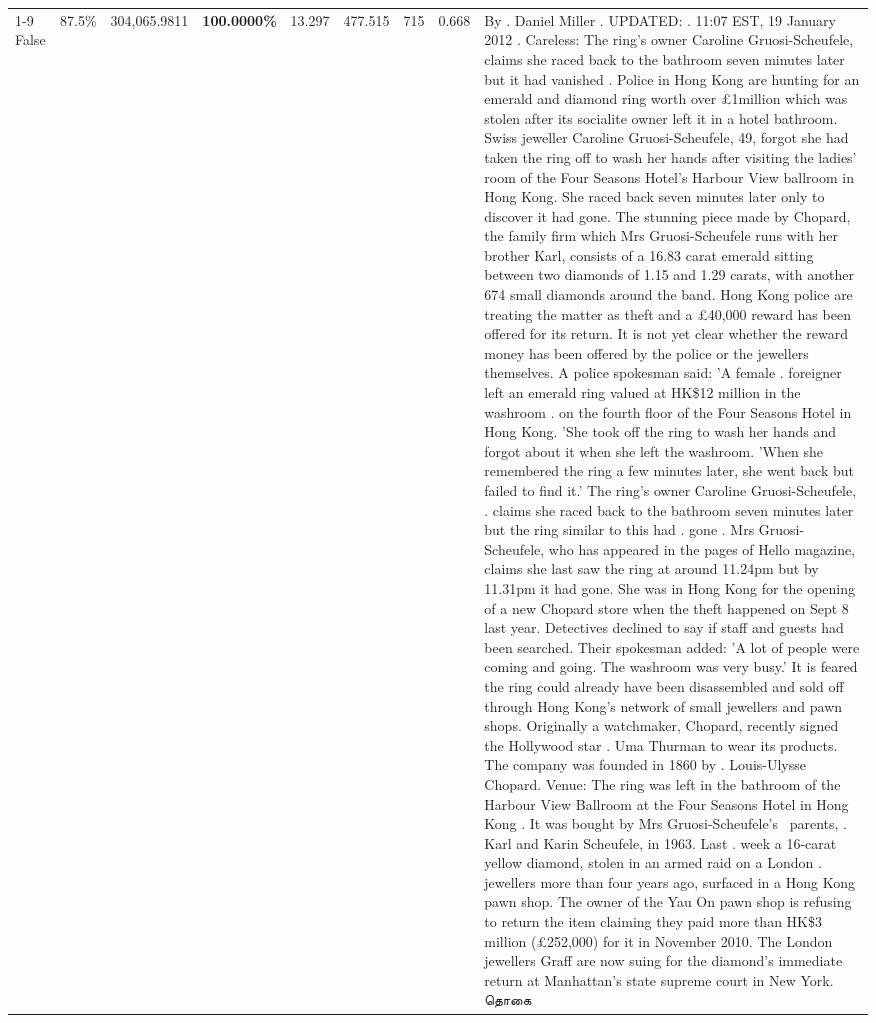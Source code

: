 \begin{table}[H]
\begin{tabular}{lllrlllll}
\cline{1-9}
False & 87.5\% & \color{red} 304,065.9811 & \bfseries \color{red} 100.0000\% & 13.297 & 477.515 & 715 & 0.668 & By . Daniel Miller . UPDATED: . 11:07 EST, 19 January 2012 . Careless: The ring's owner Caroline Gruosi-Scheufele, claims she raced back to the bathroom seven minutes later but it had vanished . Police in Hong Kong are hunting for an emerald and diamond ring worth over £1million which was stolen after its socialite owner left it in a hotel bathroom. Swiss jeweller Caroline Gruosi-Scheufele, 49, forgot she had taken the ring off to wash her hands after visiting the ladies' room of the Four Seasons Hotel's Harbour View ballroom in Hong Kong. She raced back seven minutes later only to discover it had gone. The stunning piece made by Chopard, the family firm which Mrs Gruosi-Scheufele runs with her brother Karl, consists of a 16.83 carat emerald sitting between two diamonds of 1.15 and 1.29 carats, with another 674 small diamonds around the band. Hong Kong police are treating the matter as theft and a £40,000 reward has been offered for its return. It is not yet clear whether the reward money has been offered by the police or the jewellers themselves. A police spokesman said: 'A female . foreigner left an emerald ring valued at HK\$12 million in the washroom . on the fourth floor of the Four Seasons Hotel in Hong Kong. 'She took off the ring to wash her hands and forgot about it when she left the washroom. 'When she remembered the ring a few minutes later, she went back but failed to find it.' The ring's owner Caroline Gruosi-Scheufele, . claims she raced back to the bathroom seven minutes later but the ring similar to this had . gone . Mrs Gruosi-Scheufele, who has appeared in the pages of Hello magazine, claims she last saw the ring at around 11.24pm but by 11.31pm it had gone. She was in Hong Kong for the opening of a new Chopard store when the theft happened on Sept 8 last year. Detectives declined to say if staff and guests had been searched. Their spokesman added: 'A lot of people were coming and going. The washroom was very busy.' It is feared the ring could already have been disassembled and sold off through Hong Kong's network of small jewellers and pawn shops. Originally a watchmaker, Chopard, recently signed the Hollywood star . Uma Thurman to wear its products. The company was founded in 1860 by . Louis-Ulysse Chopard. Venue: The ring was left in the bathroom of the Harbour View Ballroom at the Four Seasons Hotel in Hong Kong . It was bought by Mrs Gruosi-Scheufele's  parents, . Karl and Karin Scheufele, in 1963. Last . week a 16-carat yellow diamond, stolen in an armed raid on a London . jewellers more than four years ago, surfaced in a Hong Kong pawn shop. The owner of the Yau On pawn shop is refusing to return the item claiming they paid more than HK\$3 million (£252,000) for it in November 2010. The London jewellers Graff are now suing for the diamond’s immediate return at Manhattan’s state supreme court in New York. தொகை \\

\end{tabular}
\end{table}
